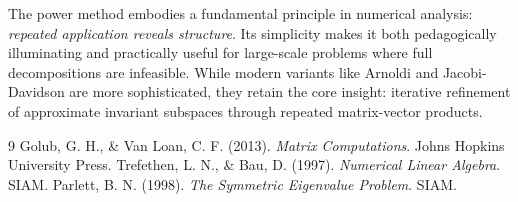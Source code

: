 \documentclass[11pt]{article}
\begin{document}
The power method embodies a fundamental principle in numerical analysis: \emph{repeated application reveals structure}. Its simplicity makes it both pedagogically illuminating and practically useful for large-scale problems where full decompositions are infeasible. While modern variants like Arnoldi and Jacobi-Davidson are more sophisticated, they retain the core insight: iterative refinement of approximate invariant subspaces through repeated matrix-vector products.

\begin{thebibliography}{9}
 Golub, G. H., \& Van Loan, C. F. (2013). \emph{Matrix Computations}. Johns Hopkins University Press.
 Trefethen, L. N., \& Bau, D. (1997). \emph{Numerical Linear Algebra}. SIAM.
 Parlett, B. N. (1998). \emph{The Symmetric Eigenvalue Problem}. SIAM.
\end{thebibliography}
\end{document}
